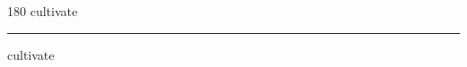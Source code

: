 
\begin{frame}
\begin{center}
\begin{turn}{180}
{\fontsize{2.5cm}{1em}\selectfont cultivate}
\end{turn}
\vspace{1em}\par  
\hrule
\vspace{1em}\par  
{\fontsize{2.5cm}{1em}\selectfont cultivate}
\end{center}
\end{frame}
